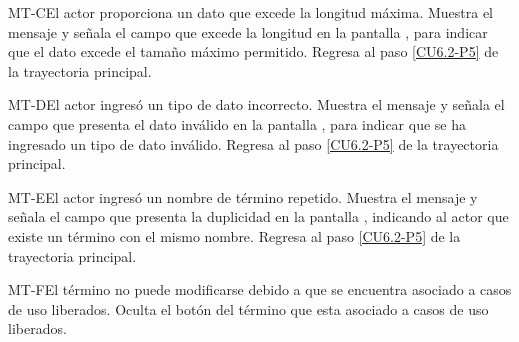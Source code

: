 	\begin{UCtrayectoriaA}{MT-C}{El actor proporciona un dato que excede la longitud máxima.}
		\UCpaso[\UCsist] Muestra el mensaje  y señala el campo que excede la longitud en la pantalla , para indicar que el dato excede el tamaño máximo permitido.
		\UCpaso Regresa al paso \ref{CU6.2-P5} de la trayectoria principal.
	\end{UCtrayectoriaA}
	
	\begin{UCtrayectoriaA}{MT-D}{El actor ingresó un tipo de dato incorrecto.}
		\UCpaso[\UCsist] Muestra el mensaje  y señala el campo que presenta el dato inválido en la pantalla , para indicar que se ha ingresado un tipo de dato inválido.
		\UCpaso Regresa al paso \ref{CU6.2-P5} de la trayectoria principal.
	\end{UCtrayectoriaA}
	
	\begin{UCtrayectoriaA}{MT-E}{El actor ingresó un nombre de término repetido.}
		\UCpaso[\UCsist] Muestra el mensaje  y señala el campo que presenta la duplicidad en la pantalla , indicando al actor que existe un término con el mismo nombre.
		\UCpaso Regresa al paso \ref{CU6.2-P5} de la trayectoria principal.
	\end{UCtrayectoriaA}

	\begin{UCtrayectoriaA}{MT-F}{El término no puede modificarse debido a que se encuentra asociado a casos de uso liberados.}
		\UCpaso[\UCsist] Oculta el botón \editar del término que esta asociado a casos de uso liberados.
	\end{UCtrayectoriaA}
